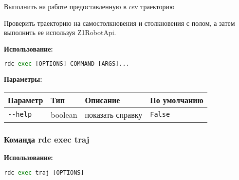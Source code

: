 Выполнить на работе предоставленную в csv траекторию

Проверить траекторию на самостолкновения и столкновения с полом, а затем выполнить ее используя Z1RobotApi.

\textbf{Использование:}
\begin{lstlisting}[language=python, numbers=none, frame=single]
rdc exec [OPTIONS] COMMAND [ARGS]...
\end{lstlisting}

\textbf{Параметры:}
\begin{center}
\fontsize{10pt}{10pt}\selectfont
\begin{longtable}[]{p{5cm}|p{2cm}|p{3.5cm}|p{5cm}}
    \hline
\toprule()
Параметр & Тип & Описание & По умолчанию \\
\hline
\midrule()
\endhead
\texttt{-\/-help} & boolean & показать справку &
\texttt{False} \\
\bottomrule()
\hline
\end{longtable}
\end{center}

\hypertarget{rdc-exec-traj}{%
\subsubsection{ Команда rdc exec traj}\label{rdc-exec-traj}}

\textbf{Использование:}
\begin{lstlisting}[language=python, numbers=none, frame=single]
rdc exec traj [OPTIONS]
\end{lstlisting}

